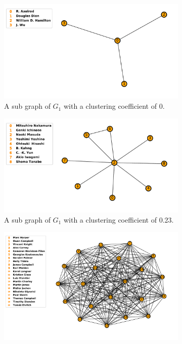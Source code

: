 \documentclass{article}
\begin{document}
\begin{center}
    \begin{figure}[!hbtp]
        \begin{subfigure}{0.33\textwidth}
            \includegraphics[width=\textwidth]{./assets/images/clustering_example_one.pdf}
            \caption{A sub graph of \(G_1\) with a clustering coefficient of 0.}
        \end{subfigure}
        \begin{subfigure}{0.33\textwidth}
            \includegraphics[width=\textwidth]{./assets/images/clustering_example_two.pdf}
            \caption{A sub graph of \(G_1\) with a clustering coefficient of 0.23.}
        \end{subfigure}
        \begin{subfigure}{0.33\textwidth}
            \includegraphics[width=\textwidth]{./assets/images/clustering_example_three.pdf}

\end{subfigure}
\end{figure}
\end{center}
\end{document}
